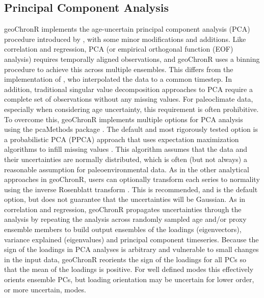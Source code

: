 \documentclass[gchron, manuscript]{copernicus}
\begin{document}
\subsection{Principal Component Analysis}

geoChronR implements the age-uncertain principal component analysis (PCA) procedure introduced by \citet{anchukaitis2013mceof}, with some minor modifications and additions.
Like correlation and regression, PCA (or empirical orthogonal function (EOF) analysis) requires temporally aligned observations, and geoChronR uses a binning procedure to achieve this across multiple ensembles.
This differs from the implementation of \citet{anchukaitis2013mceof}, who interpolated the data to a common timestep.
In addition, traditional singular value decomposition approaches to PCA require a complete set of observations without any missing values.
For paleoclimate data, especially when considering age uncertainty, this requirement is often prohibitive.
To overcome this, geoChronR implements multiple options for PCA analysis using the pcaMethods package \citep{pcaMethods}.
The default and most rigorously tested option is a probabilistic PCA (PPCA) approach that uses expectation maximization algorithms to infill missing values \citep{roweis1998algorithms}.
This algorithm assumes that the data and their uncertainties are normally distributed, which is often (but not always) a reasonable assumption for paleoenvironmental data.
As in the other analytical approaches in geoChronR, users can optionally transform each series to normality using the inverse Rosenblatt transform \citep{vanAlbada2007}.
This is recommended, and is the default option, but does not guarantee that the uncertainties will be Gaussian.
As in correlation and regression, geoChronR propagates uncertainties through the analysis by repeating the analysis across randomly sampled age and/or proxy ensemble members to build output ensembles of the loadings (eigenvectors), variance explained (eigenvalues) and principal component timeseries.
Because the sign of the loadings in PCA analyses is arbitrary and vulnerable to small changes in the input data, geoChronR reorients the sign of the loadings for all PCs so that the mean of the loadings is positive.
For well defined modes this effectively orients ensemble PCs, but loading orientation may be uncertain for lower order, or more uncertain, modes.
\end{document}

